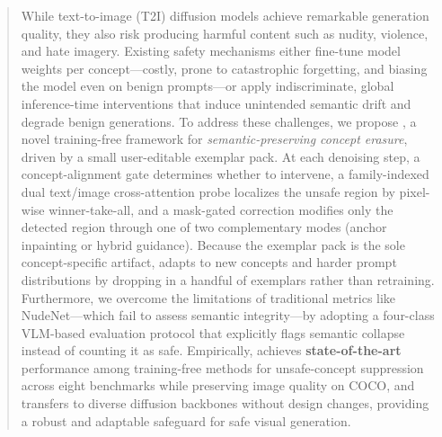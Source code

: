 \begin{abstract}
While text-to-image (T2I) diffusion models achieve remarkable generation quality, they also risk producing harmful content such as nudity, violence, and hate imagery. Existing safety mechanisms either fine-tune model weights per concept---costly, prone to catastrophic forgetting, and biasing the model even on benign prompts---or apply indiscriminate, global inference-time interventions that induce unintended semantic drift and degrade benign generations. To address these challenges, we propose \textbf{\ours{}}, a novel training-free framework for \emph{semantic-preserving concept erasure}, driven by a small user-editable exemplar pack. At each denoising step, a concept-alignment gate determines whether to intervene, a family-indexed dual text/image cross-attention probe localizes the unsafe region by pixel-wise winner-take-all, and a mask-gated correction modifies only the detected region through one of two complementary modes (anchor inpainting or hybrid guidance). Because the exemplar pack is the sole concept-specific artifact, \ours{} adapts to new concepts and harder prompt distributions by dropping in a handful of exemplars rather than retraining. Furthermore, we overcome the limitations of traditional metrics like NudeNet---which fail to assess semantic integrity---by adopting a four-class VLM-based evaluation protocol that explicitly flags semantic collapse instead of counting it as safe. Empirically, \ours{} achieves \textbf{state-of-the-art} performance among training-free methods for unsafe-concept suppression across eight benchmarks while preserving image quality on COCO, and transfers to diverse diffusion backbones without design changes, providing a robust and adaptable safeguard for safe visual generation.
\end{abstract}

